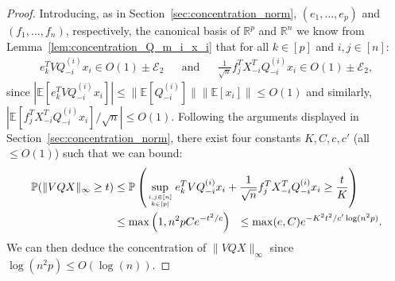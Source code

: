 \documentclass[a4papaer, titlepage]{book}
\begin{document}
\begin{proof}
Introducing, as in Section~\ref{sec:concentration_norm}, $(e_1,\ldots,e_p)$ and $(f_1,\ldots,f_n)$, respectively, the canonical basis of $\mathbb R^p$ and $\mathbb R^n$ we know from Lemma~\ref{lem:concentration_Q_m_i_x_i} that for all $k\in [p]$ and $i,j \in [n]$:
\begin{align*}
    e_k^TVQ_{-i}^{(i)} x_i \in O(1) \pm \mathcal E_2&
    &\text{and}&
    &\frac{1}{\sqrt n}f_j^TX_{-i}^T Q_{-i}^{(i)} x_i \in O(1) \pm  \mathcal E_2,
 \end{align*}
 since $|\mathbb E[e_k^TVQ_{-i}^{(i)} x_i]| \leq\|\mathbb E[Q_{-i}^{(i)}]\|\|\mathbb E[x_i]\|\leq O(1)$ and similarly, $|\mathbb E[f_j^TX_{-i}^T Q_{-i}^{(i)} x_i]/ \sqrt n| \leq O(1)$. %
Following the arguments displayed in Section~\ref{sec:concentration_norm}, there exist four constants $K,C,c,c'$ (all $\leq  O(1)$) such that we can bound:
\begin{align*}
  \mathbb P(\|VQX\|_\infty \geq t)
  &\leq \mathbb P \left( \sup_{\genfrac{}{}{0pt}{2}{i,j\in [n]}{k \in [p]}} e_k^TVQ_{-i}^{(i)} x_i + \frac{1}{\sqrt n}f_j^T X_{-i}^T Q_{-i}^{(i)} x_i \geq \frac{t}{K}\right) \\
  & \leq \max \left(1,n^2p C e^{-t^2/c} \right)
  \ \ \leq  \max(e,C) e^{-K^2t^2/c'\log(n^2p)}.
\end{align*}
We can then deduce the concentration of $\|VQX\|_\infty$ since $\log(n^2p) \leq O(\log(n))$.
 \end{proof}
\end{document}
